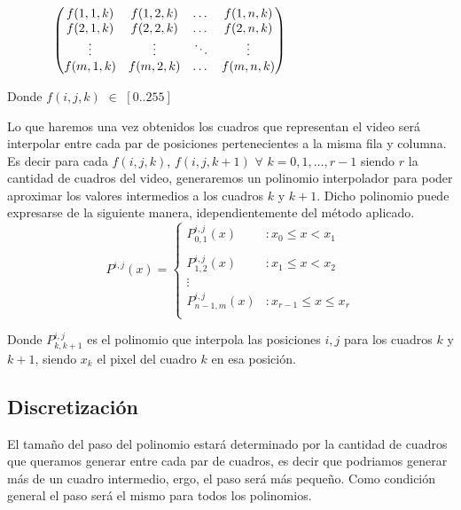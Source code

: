 \vspace{4mm}

$
\hspace{1.3cm}
     \begin{pmatrix}
      f(1, 1, k) & f(1, 2, k) & \dots & f(1, n, k) \\
	  f(2, 1, k) & f(2, 2, k) & \dots & f(2, n, k) \\
	  \vdots & \vdots & \ddots & \vdots \\
	  f(m, 1, k) & f(m, 2, k) & \dots & f(m, n, k) \\
     \end{pmatrix}
$

\vspace{4mm}

Donde $f(i, j, k)$ $\in$ $[0..255]$

Lo que haremos una vez obtenidos los cuadros que representan el video será interpolar entre cada par de posiciones pertenecientes a la misma fila y columna. Es decir para cada $f(i, j, k)$, $f(i, j, k+1)$ $\forall$ $k = 0, 1, \dots, r-1$ siendo $r$ la cantidad de cuadros del video, generaremos un polinomio interpolador para poder aproximar los valores intermedios a los cuadros $k$ y $k+1$. Dicho polinomio puede expresarse de la siguiente manera, idependientemente del método aplicado.
\vspace{4mm}
\begin{displaymath}
   P^{i,j}(x) = \left\{
     \begin{array}{lr}
       P_{0,1}^{i,j}(x)  & : x_0 \leq x < x_1\\\\
       P_{1,2}^{i,j}(x)  & : x_1 \leq x < x_2\\
       \vdots\\
       P_{n-1,m}^{i,j}(x)  & : x_{r-1} \leq x \leq x_r\\
     \end{array}
   \right.
\end{displaymath} 

Donde $P^{i,j}_{k,k+1}$ es el polinomio que interpola las posiciones $i, j$ para los cuadros $k$ y $k+1$, siendo $x_k$ el pixel del cuadro $k$ en esa posición.

\subsection{Discretización}

El tamaño del paso del polinomio estará determinado por la cantidad de cuadros que queramos generar entre cada par de cuadros, es decir que podriamos generar más de un cuadro intermedio, ergo, el paso será más pequeño. Como condición general el paso será el mismo para todos los polinomios. 

